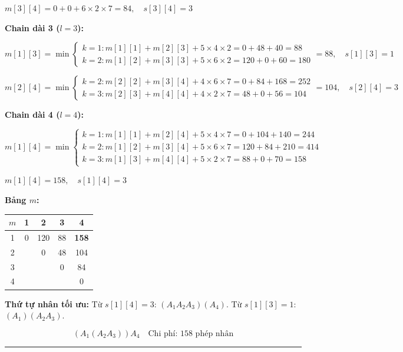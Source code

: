 \documentclass[10pt]{article}
\begin{document}
$m[3][4] = 0 + 0 + 6 \times 2 \times 7 = \boxed{84}, \quad s[3][4] = 3$

\textbf{Chain dài 3 ($l = 3$):}

$m[1][3] = \min\begin{cases} k{=}1: m[1][1] + m[2][3] + 5 \times 4 \times 2 = 0 + 48 + 40 = 88 \\ k{=}2: m[1][2] + m[3][3] + 5 \times 6 \times 2 = 120 + 0 + 60 = 180 \end{cases} = \boxed{88}, \quad s[1][3] = 1$

$m[2][4] = \min\begin{cases} k{=}2: m[2][2] + m[3][4] + 4 \times 6 \times 7 = 0 + 84 + 168 = 252 \\ k{=}3: m[2][3] + m[4][4] + 4 \times 2 \times 7 = 48 + 0 + 56 = 104 \end{cases} = \boxed{104}, \quad s[2][4] = 3$

\textbf{Chain dài 4 ($l = 4$):}

$m[1][4] = \min\begin{cases} k{=}1: m[1][1] + m[2][4] + 5 \times 4 \times 7 = 0 + 104 + 140 = 244 \\ k{=}2: m[1][2] + m[3][4] + 5 \times 6 \times 7 = 120 + 84 + 210 = 414 \\ k{=}3: m[1][3] + m[4][4] + 5 \times 2 \times 7 = 88 + 0 + 70 = 158 \end{cases}$

$m[1][4] = \boxed{158}, \quad s[1][4] = 3$

\textbf{Bảng $m$:}

\begin{center}
\begin{tabular}{|c|c|c|c|c|}
\hline
$m$ & 1 & 2 & 3 & 4 \\
\hline
1 & 0 & 120 & 88 & \textbf{158} \\
\hline
2 & & 0 & 48 & 104 \\
\hline
3 & & & 0 & 84 \\
\hline
4 & & & & 0 \\
\hline
\end{tabular}
\end{center}

\textbf{Thứ tự nhân tối ưu:} Từ $s[1][4] = 3$: $(A_1 A_2 A_3)(A_4)$. Từ $s[1][3] = 1$: $(A_1)(A_2 A_3)$.

$$\boxed{(A_1 (A_2 A_3)) A_4} \quad \text{Chi phí: 158 phép nhân}$$

\begin{center}\rule{0.5\linewidth}{0.5pt}\end{center}
\end{document}
